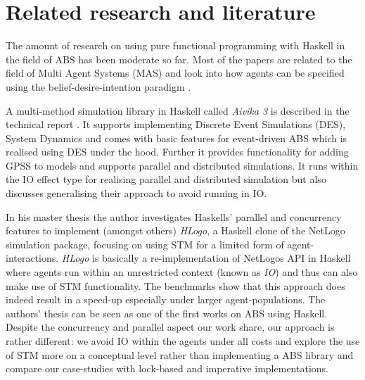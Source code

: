 \section{Related research and literature}
\label{sec:literature}

The amount of research on using pure functional programming with Haskell in the field of ABS has been moderate so far. Most of the papers are related to the field of Multi Agent Systems (MAS) and look into how agents can be specified using the belief-desire-intention paradigm \cite{de_jong_suitability_2014,sulzmann_specifying_2007,jankovic_functional_2007}.

A multi-method simulation library in Haskell called \textit{Aivika 3} is described in the technical report \cite{sorokin_aivika_2015}. It supports implementing Discrete Event Simulations (DES), System Dynamics and comes with basic features for event-driven ABS which is realised using DES under the hood. Further it provides functionality for adding GPSS to models and supports parallel and distributed simulations. It runs within the IO effect type for realising parallel and distributed simulation but also discusses generalising their approach to avoid running in IO.

In his master thesis \cite{bezirgiannis_improving_2013} the author investigates Haskells' parallel and concurrency features to implement (amongst others) \textit{HLogo}, a Haskell clone of the NetLogo \cite{wilensky_introduction_2015} simulation package, focusing on using STM for a limited form of agent-interactions. \textit{HLogo} is basically a re-implementation of NetLogos API in Haskell where agents run within an unrestricted context (known as \textit{IO}) and thus can also make use of STM functionality. The benchmarks show that this approach does indeed result in a speed-up especially under larger agent-populations. The authors' thesis can be seen as one of the first works on ABS using Haskell. Despite the concurrency and parallel aspect our work share, our approach is rather different: we avoid IO within the agents under all costs and explore the use of STM more on a conceptual level rather than implementing a ABS library and compare our case-studies with lock-based and imperative implementations.

